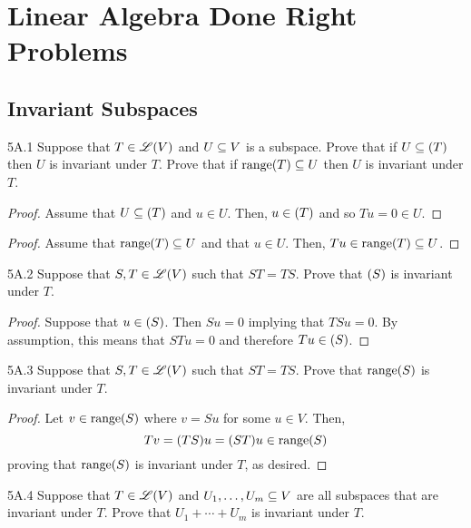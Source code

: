 \documentclass[../AlgebraQualSolutions.tex]{subfiles}
\begin{document}
\section{Linear Algebra Done Right Problems}

\subsection{Invariant Subspaces}
\begin{LA}{5A.1}{}
Suppose that $T \in \mathscr{L}(V)$ and $U \subseteq V$ is a subspace. Prove that if $U \sq \null(T)$ then $U$ is invariant under $T$. Prove that if $\mathrm{range}(T) \subseteq U$ then $U$ is invariant under $T$.
\end{LA}

\begin{proof}
Assume that $U \sq \null(T)$ and $u \in U$. Then, $u \in \null(T)$ and so $Tu = 0 \in U$.
\end{proof}

\begin{proof}
Assume that $\mathrm{range}(T) \subseteq U$ and that $u \in U$. Then, $Tu \in \mathrm{range}(T) \subseteq U$.
\end{proof}

\begin{LA}{5A.2}{}
Suppose that $S,T \in \mathscr{L}(V)$ such that $ST = TS$. Prove that $\null(S)$ is invariant under $T$.
\end{LA}

\begin{proof}
Suppose that $u \in \null(S)$. Then $S u = 0$ implying that $TS u = 0$. By assumption, this means that $STu = 0$ and therefore $Tu \in \null(S)$.
\end{proof}

\begin{LA}{5A.3}{}
Suppose that $S,T \in \mathscr{L}(V)$ such that $ST = TS$. Prove that $\mathrm{range}(S)$ is invariant under $T$.
\end{LA}

\begin{proof}
Let $v \in \mathrm{range}(S)$ where $v = Su$ for some $u \in V$. Then,
	\[Tv = (TS) u = (ST)u \in \mathrm{range}(S) \]
proving that $\mathrm{range}(S)$ is invariant under $T$, as desired.
\end{proof}

\begin{LA}{5A.4}{}
Suppose that $T \in \mathscr{L}(V)$ and $U_1, \ldots, U_m \subseteq V$ are all subspaces that are invariant under $T$. Prove that $U_1 + \cdots + U_m$ is invariant under $T$.
\end{LA}
\end{document}
